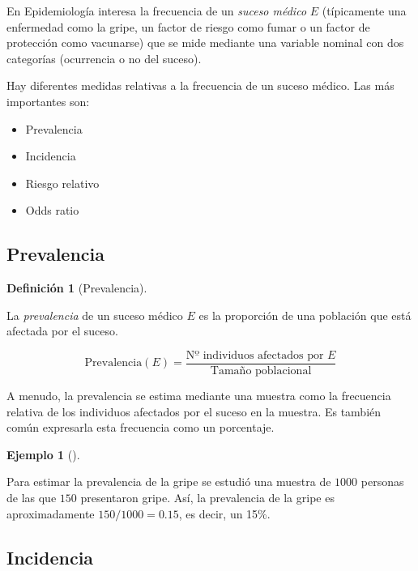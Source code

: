 \documentclass[
  a4paper,
]{scrreport}
\providecommand{\tightlist}{%
  \setlength{\itemsep}{0pt}\setlength{\parskip}{0pt}}\usepackage{longtable,booktabs,array}
\theoremstyle{plain}
\theoremstyle{definition}
\newtheorem{example}{Ejemplo}[chapter]
\theoremstyle{definition}
\newtheorem{definition}{Definición}[chapter]
\theoremstyle{remark}
\begin{document}
En Epidemiología interesa la frecuencia de un \emph{suceso médico} \(E\)
(típicamente una enfermedad como la gripe, un factor de riesgo como
fumar o un factor de protección como vacunarse) que se mide mediante una
variable nominal con dos categorías (ocurrencia o no del suceso).

Hay diferentes medidas relativas a la frecuencia de un suceso médico.
Las más importantes son:

\begin{itemize}
\tightlist
\item
  Prevalencia
\item
  Incidencia
\item
  Riesgo relativo
\item
  Odds ratio
\end{itemize}

\subsection{Prevalencia}\label{prevalencia}

\begin{definition}[Prevalencia]\protect\hypertarget{def-prevalencia}{}\label{def-prevalencia}

La \emph{prevalencia} de un suceso médico \(E\) es la proporción de una
población que está afectada por el suceso.

\[\mbox{Prevalencia}(E) = \frac{\mbox{Nº individuos afectados por $E$}}{\mbox{Tamaño poblacional}}\]

\end{definition}

A menudo, la prevalencia se estima mediante una muestra como la
frecuencia relativa de los individuos afectados por el suceso en la
muestra. Es también común expresarla esta frecuencia como un porcentaje.

\begin{example}[]\protect\hypertarget{exm-prevalencia}{}\label{exm-prevalencia}

Para estimar la prevalencia de la gripe se estudió una muestra de
\(1000\) personas de las que \(150\) presentaron gripe. Así, la
prevalencia de la gripe es aproximadamente \(150/1000=0.15\), es decir,
un 15\%.

\end{example}

\subsection{Incidencia}\label{incidencia}
\end{document}
